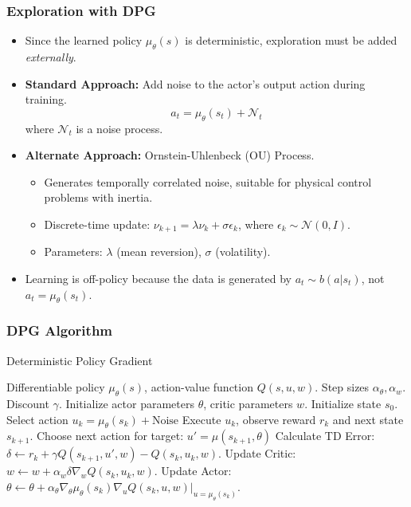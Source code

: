 \documentclass[9pt, aspectratio=169]{beamer}
\begin{document}
\begin{frame}
  \frametitle{Exploration with DPG}
    \begin{itemize}
        \item Since the learned policy $\mu_\theta(s)$ is deterministic, exploration must be added \textit{externally}.
        \item \textbf{Standard Approach:} Add noise to the actor's output action during training.
        \begin{equation*}
        a_t = \mu_\theta(s_t) + \mathcal{N}_t
        \end{equation*}
        where $\mathcal{N}_t$ is a noise process.
        \item \textbf{Alternate Approach:} Ornstein-Uhlenbeck (OU) Process.
        \begin{itemize}
            \item Generates temporally correlated noise, suitable for physical control problems with inertia.
            \item Discrete-time update: $\nu_{k+1} = \lambda \nu_k + \sigma \epsilon_k$, where $\epsilon_k \sim \mathcal{N}(0, I)$.
            \item Parameters: $\lambda$ (mean reversion), $\sigma$ (volatility).
        \end{itemize}
        \item Learning is off-policy because the data is generated by $a_t \sim b(a|s_t)$, not $a_t = \mu_\theta(s_t)$.
    \end{itemize}
\end{frame}

\begin{frame}
  \frametitle{DPG Algorithm}
    \begin{algorithm}[H]
    \captionsetup{font=small}
    \caption{Deterministic Policy Gradient}
    \begin{algorithmic}[1]
    \REQUIRE Differentiable policy $\mu_\theta(s)$, action-value function $Q(s, u, w)$.
    \REQUIRE Step sizes $\alpha_\theta, \alpha_w$. Discount $\gamma$.
    \STATE Initialize actor parameters $\theta$, critic parameters $w$.
        \STATE Initialize state $s_0$.
            \STATE Select action $u_k = \mu_\theta(s_k) + \text{Noise}$ 
            \STATE Execute $u_k$, observe reward $r_{k}$ and next state $s_{k+1}$.
            \STATE Choose next action for target: $u' = \mu(s_{k+1}, \theta)$ 
            \STATE Calculate TD Error: $\delta \leftarrow r_{k} + \gamma Q(s_{k+1}, u', w) - Q(s_k, u_k, w)$.
            \STATE Update Critic: $w \leftarrow w + \alpha_w \delta \nabla_w Q(s_k, u_k, w)$. 
            \STATE Update Actor: $\theta \leftarrow \theta + \alpha_\theta \nabla_\theta \mu_\theta(s_k) \nabla_u Q(s_k, u, w)|_{u=\mu_\theta(s_k)}$. 
        \ENDFOR
    \ENDFOR
    \end{algorithmic}
    \end{algorithm}
\end{frame}
\end{document}
